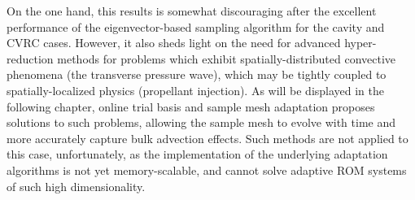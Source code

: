 On the one hand, this results is somewhat discouraging after the excellent performance of the eigenvector-based sampling algorithm for the cavity and CVRC cases. However, it also sheds light on the need for advanced hyper-reduction methods for problems which exhibit spatially-distributed convective phenomena (the transverse pressure wave), which may be tightly coupled to spatially-localized physics (propellant injection). As will be displayed in the following chapter, online trial basis and sample mesh adaptation proposes solutions to such problems, allowing the sample mesh to evolve with time and more accurately capture bulk advection effects. Such methods are not applied to this case, unfortunately, as the implementation of the underlying adaptation algorithms is not yet memory-scalable, and cannot solve adaptive ROM systems of such high dimensionality.

